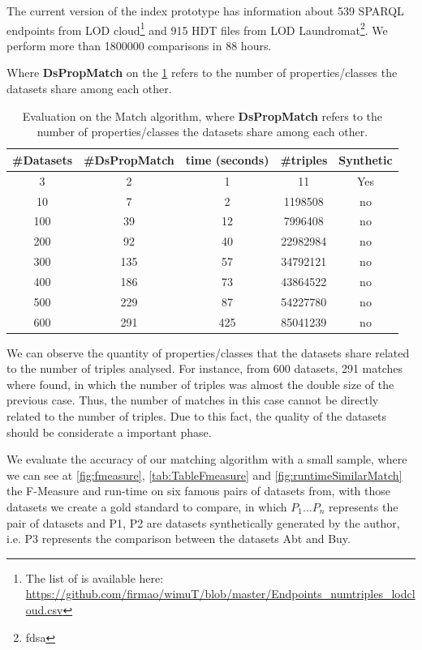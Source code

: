 \documentclass[sw]{iosart2x}
\begin{document}
The current version of the index prototype has information about 539 SPARQL endpoints from LOD cloud\footnote{The list of is available here: \url{https://github.com/firmao/wimuT/blob/master/Endpoints_numtriples_lodcloud.csv}} and 915 HDT files from LOD Laundromat\footnote{fdsa}. We perform more than \num{1800000} comparisons in 88 hours.

Where \textbf{DsPropMatch} on the \cref{tab:match} refers to the number of properties/classes the datasets share among each other.

\begin{table}[htb]
    \centering
    \begin{tabular}{|c|c|c|c|c|} \hline
    \textbf{\#Datasets} & \textbf{\#DsPropMatch} & \textbf{time (seconds)} & \textbf{\#triples} & \textbf{Synthetic} \\ \hline
    3 & 2 & 1 & 11 & Yes \\ \hline
    10 & 7 & 2 & 1198508 & no \\ \hline
    100 & 39 & 12 & 7996408 & no \\ \hline
    200 & 92 & 40 & 22982984 & no \\ \hline
    300 & 135 & 57 & 34792121 & no \\ \hline
    400 & 186 & 73 & 43864522 & no \\ \hline
    500 & 229 & 87 & 54227780 & no \\ \hline
    600 & 291 & 425 & 85041239 & no \\ \hline
    \end{tabular}
    \caption{Evaluation on the Match algorithm, where \textbf{DsPropMatch} refers to the number of properties/classes the datasets share among each other.}
    \label{tab:match}
\end{table}

We can observe the quantity of properties/classes that the datasets share related to the number of triples analysed. For instance, from 600 datasets, 291 matches where found, in which the number of triples was almost the double size of the previous case. Thus, the number of matches in this case cannot be directly related to the number of triples. Due to this fact, the quality of the datasets should be considerate a important phase.

We evaluate the accuracy of our matching algorithm with a small sample, where we can see at \cref{fig:fmeasure}, \cref{tab:TableFmeasure} and \cref{fig:runtimeSimilarMatch} the F-Measure and run-time on six famous pairs of datasets from\cite{georgala2018dynamic}, with those datasets we create a gold standard to compare, in which $P_1...P_n$ represents the pair of datasets and P1, P2 are datasets synthetically generated by the author, i.e. P3 represents the comparison between the datasets Abt and Buy.
\end{document}
